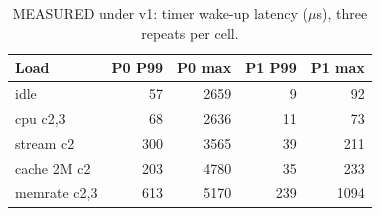 \begin{table}[H]
\centering\small
\caption{MEASURED under v1: timer wake-up latency ($\mu$s), three repeats per cell.}\label{tab:timer}
\begin{tabular}{lrrrr}
\toprule
Load & P0 P99 & P0 max & P1 P99 & P1 max \\
\midrule
idle & 57 & 2659 & 9 & 92 \\
cpu c2,3 & 68 & 2636 & 11 & 73 \\
stream c2 & 300 & 3565 & 39 & 211 \\
cache 2M c2 & 203 & 4780 & 35 & 233 \\
memrate c2,3 & 613 & 5170 & 239 & 1094 \\
\bottomrule
\end{tabular}
\end{table}
